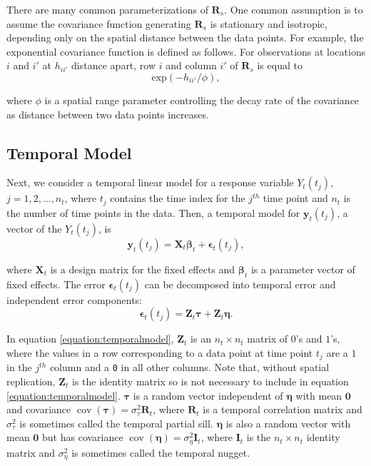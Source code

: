 \documentclass[]{interact}
\theoremstyle{plain}%
\theoremstyle{definition}
\theoremstyle{remark}
\begin{document}
There are many common parameterizations of \(\mathbf{R}_{s}\). One
common assumption is to assume the covariance function generating
\(\mathbf{R}_s\) is stationary and isotropic, depending only on the
spatial distance between the data points. For example, the exponential
covariance function is defined as follows. For observations at locations
\(i\) and \(i'\) at \(h_{ii'}\) distance apart, row \(i\) and column
\(i'\) of \(\mathbf{R}_{s}\) is equal to \mbox{} \begin{equation}
\label{equation:spatcov}
\text{exp}(-h_{ii'} / \phi),
\end{equation}

\noindent where \(\phi\) is a spatial range parameter controlling the
decay rate of the covariance as distance between two data points
increases.

\subsection{Temporal Model} \label{subsection:temporalmodel}

Next, we consider a temporal linear model for a response variable
\(Y_t(t_j)\), \(j = 1, 2, \ldots, n_{t}\), where \(t_j\) contains the
time index for the \(j^{th}\) time point and \(n_t\) is the number of
time points in the data. Then, a temporal model for
\(\mathbf{y}_t(t_j)\), a vector of the \(Y_t(t_j)\), is \mbox{}
\begin{equation}
\mathbf{y}_t(t_j) = \mathbf{X}_t \bm{\beta}_t + \bm{\epsilon}_t(t_j),
\end{equation}

\noindent where \(\mathbf{X}_t\) is a design matrix for the fixed
effects and \(\bm{\beta}_t\) is a parameter vector of fixed effects. The
error \(\bm{\epsilon}_t(t_j)\) can be decomposed into temporal error and
independent error components: \mbox{} \begin{equation}
\label{equation:temporalmodel}
\bm{\epsilon}_t(t_j) = \mathbf{Z}_{t} \bm{\tau} + \mathbf{Z}_{t} \bm{\eta}.
\end{equation}

\noindent In equation \ref{equation:temporalmodel}, \(\mathbf{Z}_{t}\)
is an \(n_t \times n_t\) matrix of \(0\)'s and \(1\)'s, where the values
in a row corresponding to a data point at time point \(t_j\) are a \(1\)
in the \(j^{th}\) column and a \texttt{0} in all other columns. Note
that, without spatial replication, \(\mathbf{Z}_t\) is the identity
matrix so is not necessary to include in equation
\ref{equation:temporalmodel}. \(\bm{\tau}\) is a random vector
independent of \(\bm{\eta}\) with mean \(\mathbf{0}\) and covariance
\(\mathop{\mathrm{{cov}}}(\bm{\tau}) = \sigma^2_{\tau} \mathbf{R}_{t}\),
where \(\mathbf{R}_t\) is a temporal correlation matrix and
\(\sigma^2_{\tau}\) is sometimes called the temporal partial sill.
\(\bm{\eta}\) is also a random vector with mean \(\mathbf{0}\) but has
covariance
\(\mathop{\mathrm{{cov}}}(\bm{\eta}) = \sigma^2_{\eta} \mathbf{I}_{t}\),
where \(\mathbf{I}_t\) is the \(n_t \times n_t\) identity matrix and
\(\sigma^2_{\eta}\) is sometimes called the temporal nugget.
\end{document}
